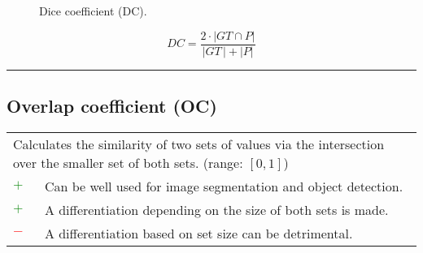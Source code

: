 \documentclass{article}
\begin{document}
\begin{figure}[H]
	\centering


	\caption{Dice coefficient (DC).}
	\label{figure:DC}
\end{figure}

\begin{equation}
	\textit{DC} = \dfrac{2 \cdot |\textit{GT} \cap P|}{|\textit{GT}\,| + |P|}
%
	\label{equation:DC}
\end{equation}

\hrule


\subsection[Overlap coefficient (OC)]{Overlap coefficient (OC) \cite{szymkiewicz1934conlribution, sempson1947holarctic, bell1962mutual, goodall1978sample}}

\begin{table}[H]\centering
	\begin{tabular}{m{}m{}}
		\multicolumn{2}{m{0.95\textwidth}}{Calculates the similarity of two sets of values via the intersection over the smaller set of both sets. (range: $[0, 1]$)} \\
		\textcolor{Green}{$+$} & Can be well used for image segmentation and object detection. \\
		\textcolor{Green}{$+$} & A differentiation depending on the size of both sets is made. \\
		\textcolor{Red}{$-$}   & A differentiation based on set size can be detrimental.
	\end{tabular}
\end{table}
\end{document}
